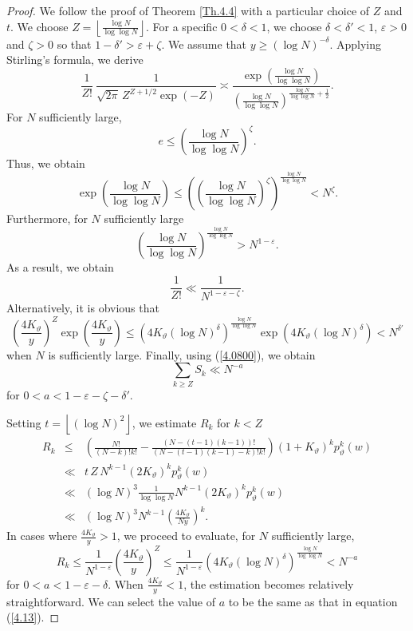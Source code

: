 \documentclass[10pt,a4paper]{amsart}
\begin{document}
\begin{proof}
We follow the proof of Theorem \ref{Th.4.4} with a particular choice of $Z$ and $t$. 
We choose $Z = \left \lfloor \frac{\log N}{\log \log N}\right \rfloor$. 
For a specific $0<\delta <1$, we choose $\delta < \delta' < 1$, $\varepsilon >0$ and $\zeta > 0$ so that $1 - \delta' > \varepsilon + \zeta$. 
We assume that $y \geq (\log N)^{-\delta}$. 
Applying Stirling's formula, we derive
\[
\frac{1}{Z!} ~ \frac{1}{\sqrt{2\pi} \, Z^{Z+1/2} \exp(-Z)} \asymp \frac{\exp\left(\frac{\log N}{\log \log N} \right)}{\left( \frac{\log N}{\log \log N} \right)^{\frac{\log N}{\log \log N} +\frac{1}{2}}  }.
\]
For $N$ sufficiently large,
\[
e \leq \left( \frac{\log N}{\log \log N} \right)^{\zeta}.
\]
Thus, we obtain
\[
\exp\left(\frac{\log N}{\log \log N} \right) \leq \left( \left( \frac{\log N}{\log \log N} \right)^{\zeta} \right)^{\frac{\log N}{\log \log N}} < N^{\zeta}.
\]
Furthermore, for $N$ sufficiently large
\[
\left( \frac{\log N}{\log \log N} \right)^{\frac{\log N}{\log \log N}} > N^{1-\varepsilon}.
\]
As a result, we obtain
\begin{equation} \label{4.12}
\frac{1}{Z!} \ll \frac{1}{N^{1-\varepsilon-\zeta}}.
\end{equation}
Alternatively, it is obvious that
\[
\left(\frac{4K_{\vartheta}}{y}\right)^Z \exp\left(\frac{4K_{\vartheta}}{y}\right) \leq \left( 4K_{\vartheta}\left( \log N \right)^{\delta} \right)^{\frac{\log N}{\log \log N}} \exp \left( 4K_{\vartheta}\left( \log N \right)^{\delta} \right) < N^{\delta'}
\]
when $N$ is sufficiently large. 
Finally, using (\ref{4.0800}), we obtain
\begin{equation} \label{4.13}
\sum_{k \geq Z} S_k \ll N^{-a}
\end{equation}
for $0 < a < 1-\varepsilon - \zeta - \delta'$. 

Setting $t = \left \lfloor (\log N)^2\right\rfloor$, we estimate $R_k$ for $k<Z$
\begin{eqnarray*}
R_k &\leq& \left( \frac{N!}{(N-k)!k!} - \frac{(N-(t-1)(k-1))!}{(N-(t-1)(k-1)-k)!k!} \right) (1+K_{\vartheta})^k p^k_{\vartheta}(w) \\
&\ll& t \, Z\, N^{k-1} (2K_{\vartheta})^k p^k_{\vartheta}(w) \\
&\ll& (\log N)^3 \frac{1}{\log \log N} N^{k-1} (2K_{\vartheta})^k p^k_{\vartheta}(w) \\
&\ll& (\log N)^3 N^{k-1} \left( \frac{4K_{\vartheta}}{Ny}\right)^k.
\end{eqnarray*}
In cases where $\frac{4K_{\vartheta}}{y} > 1$, we proceed to evaluate, for $N$ sufficiently large,
\begin{equation} \label{4.14}
R_{k} \leq \frac{1}{N^{1-\varepsilon}}\left(\frac{4K_{\vartheta}}{y}\right)^Z 
\leq \frac{1}{N^{1-\varepsilon}} \left( 4K_{\vartheta} (\log N)^{\delta}\right)^{\frac{\log N}{\log \log N}} < N^{-a}
\end{equation}
for $0 < a < 1-\varepsilon - \delta$. 
When $\frac{4K_{\vartheta}}{y} < 1$, the estimation becomes relatively straightforward.
We can select the value of $a$ to be the same as that in equation (\ref{4.13}). 


\end{proof}
\end{document}
